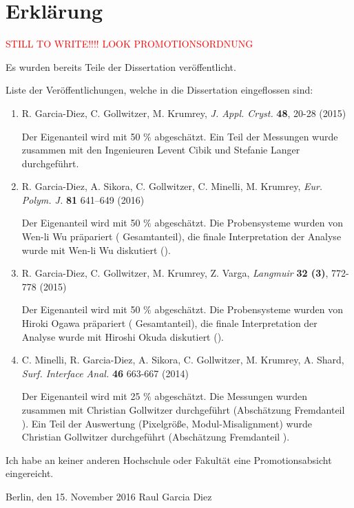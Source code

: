 \noindent
\pagestyle{empty}

\section*{Erklärung}

\textcolor{red}{STILL TO WRITE!!!! LOOK PROMOTIONSORDNUNG}
\vspace{2ex}

Es wurden bereits Teile der Dissertation veröffentlicht.
\vspace{2ex}

Liste der Veröffentlichungen, welche in die Dissertation eingeflossen sind:

\begin{enumerate}

    \item R. Garcia-Diez, C. Gollwitzer, M. Krumrey, \emph{J. Appl. Cryst.} \textbf{48}, 20-28 (2015)

        Der Eigenanteil wird mit 50 $\%$ abgeschätzt.
        Ein Teil der Messungen wurde zusammen mit den Ingenieuren Levent Cibik und Stefanie Langer durchgeführt.

    \item R. Garcia-Diez, A. Sikora, C. Gollwitzer, C. Minelli, M. Krumrey, \emph{Eur. Polym. J.} \textbf{81} 641–649 (2016) 

        Der Eigenanteil wird mit 50 $\%$ abgeschätzt.
        Die Probensysteme wurden von Wen-li Wu präpariert ( Gesamtanteil), die finale Interpretation der Analyse wurde mit Wen-li Wu diskutiert ().

    \item R. Garcia-Diez, C. Gollwitzer, M. Krumrey, Z. Varga, \emph{Langmuir} \textbf{32 (3)}, 772-778 (2015)

        Der Eigenanteil wird mit 50 $\%$ abgeschätzt.
        Die Probensysteme wurden von Hiroki Ogawa präpariert ( Gesamtanteil), die finale Interpretation der Analyse wurde mit Hiroshi Okuda diskutiert ().

    \item C. Minelli, R. Garcia-Diez, A. Sikora, C. Gollwitzer, M. Krumrey, A. Shard, \emph{Surf. Interface Anal.} \textbf{46} 663-667 (2014)

        Der Eigenanteil wird mit 25 $\%$ abgeschätzt.
        Die Messungen wurden zusammen mit Christian Gollwitzer durchgeführt (Abschätzung Fremdanteil ).
        Ein Teil der Auswertung (Pixelgröße, Modul-Misalignment) wurde Christian Gollwitzer durchgeführt (Abschätzung Fremdanteil ).

\end{enumerate}


Ich habe an keiner anderen Hochschule oder Fakultät eine Promotionsabsicht eingereicht.

\vspace{3cm}

\noindent Berlin, den 15. November 2016 \hfill Raul Garcia Diez

\cleardoublepage
